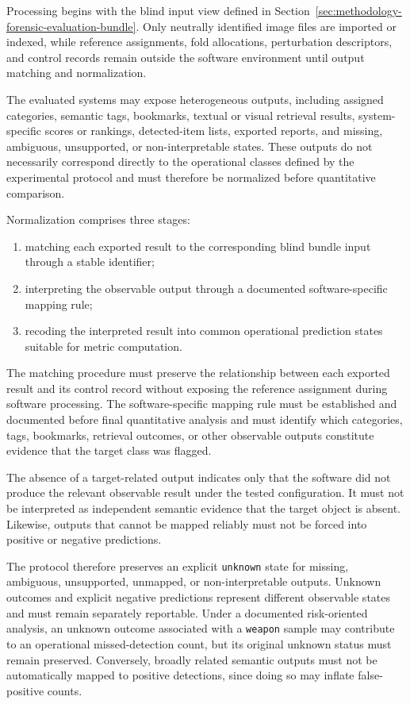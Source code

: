 Processing begins with the blind input view defined in
Section~\ref{sec:methodology-forensic-evaluation-bundle}. Only neutrally
identified image files are imported or indexed, while reference assignments,
fold allocations, perturbation descriptors, and control records remain outside
the software environment until output matching and normalization.

The evaluated systems may expose heterogeneous outputs, including assigned
categories, semantic tags, bookmarks, textual or visual retrieval results,
system-specific scores or rankings, detected-item lists, exported reports, and
missing, ambiguous, unsupported, or non-interpretable states. These outputs do
not necessarily correspond directly to the operational classes defined by the
experimental protocol and must therefore be normalized before quantitative
comparison.

Normalization comprises three stages:

\begin{enumerate}
\item matching each exported result to the corresponding blind bundle input
through a stable identifier;

\item interpreting the observable output through a documented
software-specific mapping rule;

\item recoding the interpreted result into common operational prediction states
suitable for metric computation.
\end{enumerate}

The matching procedure must preserve the relationship between each exported
result and its control record without exposing the reference assignment during
software processing. The software-specific mapping rule must be established
and documented before final quantitative analysis and must identify which
categories, tags, bookmarks, retrieval outcomes, or other observable outputs
constitute evidence that the target class was flagged.

The absence of a target-related output indicates only that the software did not
produce the relevant observable result under the tested configuration. It must
not be interpreted as independent semantic evidence that the target object is
absent. Likewise, outputs that cannot be mapped reliably must not be forced
into positive or negative predictions.

The protocol therefore preserves an explicit \texttt{unknown} state for
missing, ambiguous, unsupported, unmapped, or non-interpretable outputs.
Unknown outcomes and explicit negative predictions represent different
observable states and must remain separately reportable. Under a documented
risk-oriented analysis, an unknown outcome associated with a
\texttt{weapon} sample may contribute to an operational missed-detection count,
but its original unknown status must remain preserved. Conversely, broadly
related semantic outputs must not be automatically mapped to positive
detections, since doing so may inflate false-positive counts.

